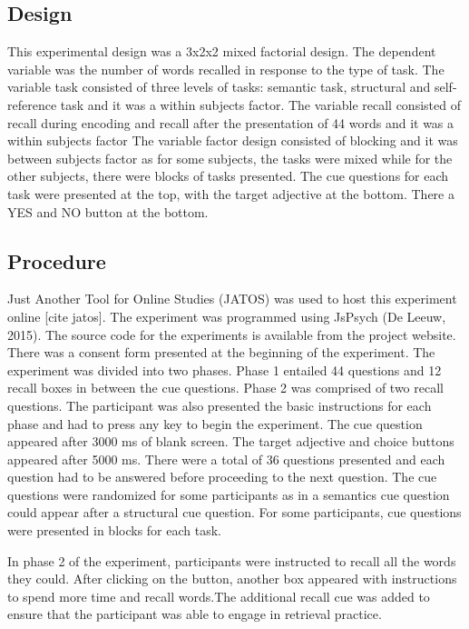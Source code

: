 \documentclass[
  man,floatsintext]{apa6}
\begin{document}
\hypertarget{design}{%
\subsection{Design}\label{design}}

This experimental design was a 3x2x2 mixed factorial design. The dependent variable was the number of words recalled in response to the type of task. The variable task consisted of three levels of tasks: semantic task, structural and self-reference task and it was a within subjects factor. The variable recall consisted of recall during encoding and recall after the presentation of 44 words and it was a within subjects factor The variable factor design consisted of blocking and it was between subjects factor as for some subjects, the tasks were mixed while for the other subjects, there were blocks of tasks presented. The cue questions for each task were presented at the top, with the target adjective at the bottom. There a YES and NO button at the bottom.

\hypertarget{procedure}{%
\subsection{Procedure}\label{procedure}}

Just Another Tool for Online Studies (JATOS) was used to host this experiment online {[}cite jatos{]}. The experiment was programmed using JsPsych (De Leeuw, 2015). The source code for the experiments is available from the project website. There was a consent form presented at the beginning of the experiment. The experiment was divided into two phases. Phase 1 entailed 44 questions and 12 recall boxes in between the cue questions. Phase 2 was comprised of two recall questions. The participant was also presented the basic instructions for each phase and had to press any key to begin the experiment. The cue question appeared after 3000 ms of blank screen. The target adjective and choice buttons appeared after 5000 ms. There were a total of 36 questions presented and each question had to be answered before proceeding to the next question. The cue questions were randomized for some participants as in a semantics cue question could appear after a structural cue question. For some participants, cue questions were presented in blocks for each task.

In phase 2 of the experiment, participants were instructed to recall all the words they could. After clicking on the button, another box appeared with instructions to spend more time and recall words.The additional recall cue was added to ensure that the participant was able to engage in retrieval practice.
\end{document}
